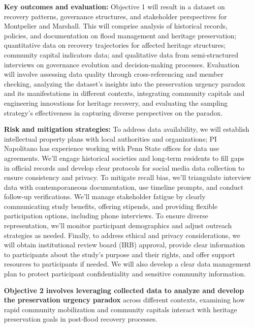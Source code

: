 \documentclass[11pt]{article}
\begin{document}
\textbf{Key outcomes and evaluation:}
Objective 1 will result in a dataset on recovery patterns, governance structures, and stakeholder perspectives for Montpelier and Marshall. 
This will comprise analysis of historical records, policies, and documentation on flood management and heritage preservation; quantitative data on recovery trajectories for affected heritage structures; community capital indicators data; and qualitative data from semi-structured interviews on governance evolution and decision-making processes. 
Evaluation will involve assessing data quality through cross-referencing and member checking, analyzing the dataset's insights into the preservation urgency paradox and its manifestations in different contexts, integrating community capitals and engineering innovations for heritage recovery, and evaluating the sampling strategy's effectiveness in capturing diverse perspectives on the paradox.

\textbf{Risk and mitigation strategies:}
To address data availability, we will establish intellectual property plans with local authorities and organizations; PI Napolitano has experience working with Penn State offices for data use agreements.
We'll engage historical societies and long-term residents to fill gaps in official records and develop clear protocols for social media data collection to ensure consistency and privacy. 
To mitigate recall bias, we'll triangulate interview data with contemporaneous documentation, use timeline prompts, and conduct follow-up verifications. 
We'll manage stakeholder fatigue by clearly communicating study benefits, offering stipends, and providing flexible participation options, including phone interviews. 
To ensure diverse representation, we'll monitor participant demographics and adjust outreach strategies as needed.
Finally, to address ethical and privacy considerations, we will obtain institutional review board (IRB) approval, provide clear information to participants about the study's purpose and their rights, and offer support resources to participants if needed.
We will also develop a clear data management plan to protect participant confidentiality and sensitive community information.

\begin{tcolorbox}[colback=mycmykcolor, colframe=black, boxrule=1pt, coltext=black,left=1mm, right=1mm, top=1mm, bottom=1mm]
\textbf{Objective 2 involves leveraging collected data to analyze and develop the preservation urgency paradox} across different contexts, examining how rapid community mobilization and community capitals interact with heritage preservation goals in post-flood recovery processes.
\end{tcolorbox}
\end{document}

